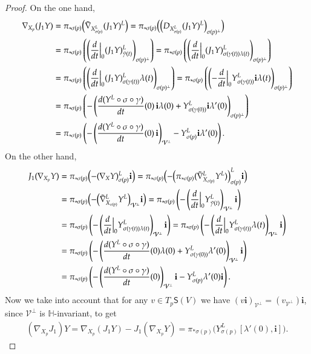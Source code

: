 \documentclass[12pt, a4paper]{amsart}
\renewcommand{\H}{\mathbb{H}}
\theoremstyle{remark}
\begin{document}
\begin{proof}
On the one hand,
\[
\begin{aligned}
\nabla_{X_p}(J_1 Y)
&{}=\pi_{*\sigma(p)}\Bigl(\tilde{\nabla}_{X_{\sigma(p)}^L}(J_1 Y)^L\Bigr)
=\pi_{*\sigma(p)}\Bigl(\Bigl(D_{X_{\sigma(p)}^L}(J_1 Y)^L\Bigr)_{\sigma(p)^\perp}\Bigr)\\
&{}=\pi_{*\sigma(p)}\left(
\left(\frac{d}{dt}\Big\vert_0 (J_1 Y)_{\tilde{\gamma}(t)}^L\right)_{\sigma(p)^\perp}\right)
=\pi_{*\sigma(p)}\left(
\left(\frac{d}{dt}\Big\vert_0 (J_1 Y)_{\sigma(\gamma(t))\lambda(t)}^L\right)_{\sigma(p)^\perp}\right)\\
&{}=\pi_{*\sigma(p)}\left(
\left(\frac{d}{dt}\Big\vert_0 (J_1 Y)_{\sigma(\gamma(t))}^L\lambda(t)\right)_{\sigma(p)^\perp}\right)
=\pi_{*\sigma(p)}\left(
\left(-\frac{d}{dt}\Big\vert_0 Y_{\sigma(\gamma(t))}^L\mathbf{i}\lambda(t)\right)_{\sigma(p)^\perp}\right)\\
&{}=\pi_{*\sigma(p)}\left(
-\left(\frac{d(Y^L\circ\sigma\circ\gamma)}{dt}(0)\,\mathbf{i}\lambda(0) +Y_{\sigma(\gamma(0))}^L\mathbf{i}\lambda'(0)\right)_{\sigma(p)^\perp}\right)\\
&{}=\pi_{*\sigma(p)}\left(
-\left(\frac{d(Y^L\circ\sigma\circ\gamma)}{dt}(0)\,\mathbf{i}\right)_{\mathcal{V}^\perp} -Y_{\sigma(p)}^L\mathbf{i}\lambda'(0)\right).
\end{aligned}
\]
On the other hand,
\[
\begin{aligned}
J_1(\nabla_{X_p}Y)
&{}=\pi_{*\sigma(p)}\Bigl(-(\nabla_X Y)_{\sigma(p)}^L\mathbf{i}\Bigr)
=\pi_{*\sigma(p)}\Bigl(
-\Bigl(\pi_{*\sigma(p)}(\tilde{\nabla}_{X_{\sigma(p)}}^L Y^L)\Bigr)_{\sigma(p)}^L\mathbf{i}\Bigr)\\
&{}=\pi_{*\sigma(p)}\Bigl(
-\Bigl(\tilde{\nabla}_{X_{\sigma(p)}}^L Y^L\Bigr)_{\mathcal{V}^\perp}\mathbf{i}\Bigr)
=\pi_{*\sigma(p)}\left(
-\left(\frac{d}{dt}\Big\vert_0 Y_{\tilde{\gamma}(t)}^L\right)_{\mathcal{V}^\perp}\mathbf{i}\right)\\
&{}=\pi_{*\sigma(p)}\left(
-\left(\frac{d}{dt}\Big\vert_0  Y_{\sigma(\gamma(t))\lambda(t)}^L\right)_{\mathcal{V}^\perp}\mathbf{i}\right)
=\pi_{*\sigma(p)}\left(
-\left(\frac{d}{dt}\Big\vert_0  Y_{\sigma(\gamma(t))}^L\lambda(t)\right)_{\mathcal{V}^\perp}\mathbf{i}\right)\\
&{}=\pi_{*\sigma(p)}\left(
-\left(\frac{d(Y^L\circ\sigma\circ\gamma)}{dt}(0)\lambda(0) +Y_{\sigma(\gamma(0))}^L\lambda'(0)\right)_{\mathcal{V}^\perp}\mathbf{i}\right)\\
&{}=\pi_{*\sigma(p)}\left(
-\left(\frac{d(Y^L\circ\sigma\circ\gamma)}{dt}(0)\right)_{\mathcal{V}^\perp}\mathbf{i} -Y_{\sigma(p)}^L\lambda'(0)\mathbf{i}\right).
\end{aligned}
\]
Now we take into account that for any $v\in T_p\mathsf{S}(V)$ we have 
$(v\mathbf{i})_{\mathcal{V}^\perp}=(v_{\mathcal{V}^\perp})\mathbf{i}$, since $\mathcal{V}^\perp$ is $\H$-invariant, to get
\[
\begin{aligned}
(\nabla_{X_p}J_1)Y
=\nabla_{X_p}(J_1 Y)-J_1(\nabla_{X_p}Y)
=\pi_{*\sigma(p)}\bigl(Y_{\sigma(p)}^L[\lambda'(0),\mathbf{i}]\bigr).
\end{aligned}
\]


\end{proof}
\end{document}
